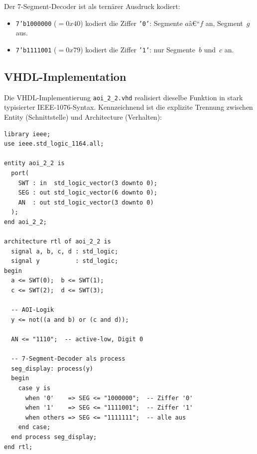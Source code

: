 ﻿\documentclass[12pt,a4paper]{report}
\begin{document}
Der 7-Segment-Decoder ist als ternärer Ausdruck kodiert:
\begin{itemize}
    \item \texttt{7'b1000000} ($=0x40$) kodiert die Ziffer \texttt{'0'}: Segmente $a$â€“$f$
          an, Segment~$g$ aus.
    \item \texttt{7'b1111001} ($=0x79$) kodiert die Ziffer \texttt{'1'}: nur
          Segmente~$b$ und~$c$ an.
\end{itemize}

\subsection{VHDL-Implementation}
\label{sssec:aoi_vhdl}

Die VHDL-Implementierung \texttt{aoi\_2\_2.vhd} realisiert dieselbe Funktion
in stark typisierter IEEE-1076-Syntax. Kennzeichnend ist die explizite
Trennung zwischen Entity (Schnittstelle) und Architecture (Verhalten):

\begin{lstlisting}[style=hdlstyle, caption={VHDL-Implementation des AOI-2-2-Schaltkreises (\texttt{aoi\_2\_2.vhd})}]
library ieee;
use ieee.std_logic_1164.all;

entity aoi_2_2 is
  port(
    SWT : in  std_logic_vector(3 downto 0);
    SEG : out std_logic_vector(6 downto 0);
    AN  : out std_logic_vector(3 downto 0)
  );
end aoi_2_2;

architecture rtl of aoi_2_2 is
  signal a, b, c, d : std_logic;
  signal y          : std_logic;
begin
  a <= SWT(0);  b <= SWT(1);
  c <= SWT(2);  d <= SWT(3);

  -- AOI-Logik
  y <= not((a and b) or (c and d));

  AN <= "1110";  -- active-low, Digit 0

  -- 7-Segment-Decoder als process
  seg_display: process(y)
  begin
    case y is
      when '0'    => SEG <= "1000000";  -- Ziffer '0'
      when '1'    => SEG <= "1111001";  -- Ziffer '1'
      when others => SEG <= "1111111";  -- alle aus
    end case;
  end process seg_display;
end rtl;
\end{lstlisting}
\end{document}
